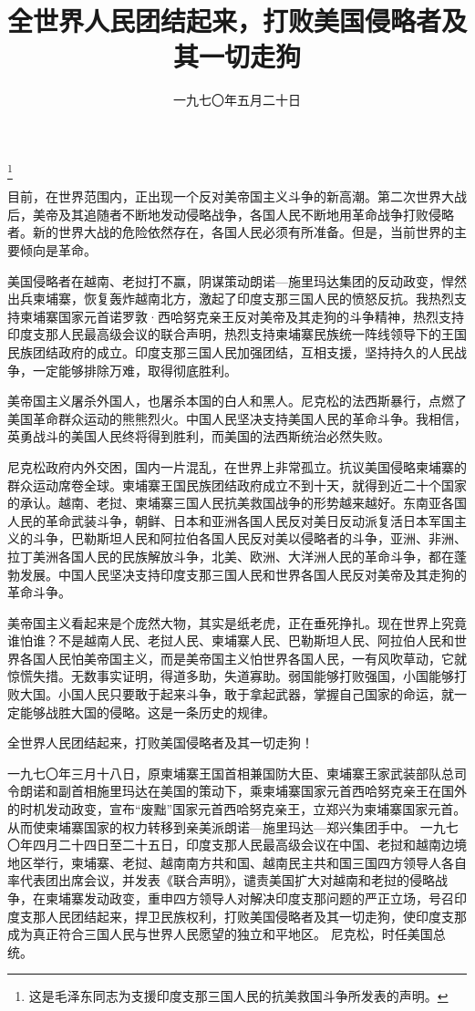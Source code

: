 
\title{全世界人民团结起来，打败美国侵略者及其一切走狗}
\date{一九七〇年五月二十日}
\thanks{这是毛泽东同志为支援印度支那三国人民的抗美救国斗争所发表的声明。}
\maketitle


目前，在世界范围内，正出现一个反对美帝国主义斗争的新高潮。第二次世界大战后，美帝及其追随者不断地发动侵略战争，各国人民不断地用革命战争打败侵略者。新的世界大战的危险依然存在，各国人民必须有所准备。但是，当前世界的主要倾向是革命。

美国侵略者在越南、老挝打不赢，阴谋策动朗诺—施里玛达集团的反动政变，悍然出兵柬埔寨，恢复轰炸越南北方，激起了印度支那三国人民的愤怒反抗。我热烈支持柬埔寨国家元首诺罗敦·西哈努克亲王反对美帝及其走狗的斗争精神，热烈支持印度支那人民最高级会议的联合声明，热烈支持柬埔寨民族统一阵线领导下的王国民族团结政府的成立。印度支那三国人民加强团结，互相支援，坚持持久的人民战争，一定能够排除万难，取得彻底胜利。

美帝国主义屠杀外国人，也屠杀本国的白人和黑人。尼克松的法西斯暴行，点燃了美国革命群众运动的熊熊烈火。中国人民坚决支持美国人民的革命斗争。我相信，英勇战斗的美国人民终将得到胜利，而美国的法西斯统治必然失败。

尼克松政府内外交困，国内一片混乱，在世界上非常孤立。抗议美国侵略柬埔寨的群众运动席卷全球。柬埔寨王国民族团结政府成立不到十天，就得到近二十个国家的承认。越南、老挝、柬埔寨三国人民抗美救国战争的形势越来越好。东南亚各国人民的革命武装斗争，朝鲜、日本和亚洲各国人民反对美日反动派复活日本军国主义的斗争，巴勒斯坦人民和阿拉伯各国人民反对美以侵略者的斗争，亚洲、非洲、拉丁美洲各国人民的民族解放斗争，北美、欧洲、大洋洲人民的革命斗争，都在蓬勃发展。中国人民坚决支持印度支那三国人民和世界各国人民反对美帝及其走狗的革命斗争。

美帝国主义看起来是个庞然大物，其实是纸老虎，正在垂死挣扎。现在世界上究竟谁怕谁？不是越南人民、老挝人民、柬埔寨人民、巴勒斯坦人民、阿拉伯人民和世界各国人民怕美帝国主义，而是美帝国主义怕世界各国人民，一有风吹草动，它就惊慌失措。无数事实证明，得道多助，失道寡助。弱国能够打败强国，小国能够打败大国。小国人民只要敢于起来斗争，敢于拿起武器，掌握自己国家的命运，就一定能够战胜大国的侵略。这是一条历史的规律。

全世界人民团结起来，打败美国侵略者及其一切走狗！

\begin{maonote}
一九七〇年三月十八日，原柬埔寨王国首相兼国防大臣、柬埔寨王家武装部队总司令朗诺和副首相施里玛达在美国的策动下，乘柬埔寨国家元首西哈努克亲王在国外的时机发动政变，宣布“废黜”国家元首西哈努克亲王，立郑兴为柬埔寨国家元首。从而使柬埔寨国家的权力转移到亲美派朗诺—施里玛达—郑兴集团手中。
一九七〇年四月二十四日至二十五日，印度支那人民最高级会议在中国、老挝和越南边境地区举行，柬埔寨、老挝、越南南方共和国、越南民主共和国三国四方领导人各自率代表团出席会议，并发表《联合声明》，谴责美国扩大对越南和老挝的侵略战争，在柬埔寨发动政变，重申四方领导人对解决印度支那问题的严正立场，号召印度支那人民团结起来，捍卫民族权利，打败美国侵略者及其一切走狗，使印度支那成为真正符合三国人民与世界人民愿望的独立和平地区。
尼克松，时任美国总统。
\end{maonote}
